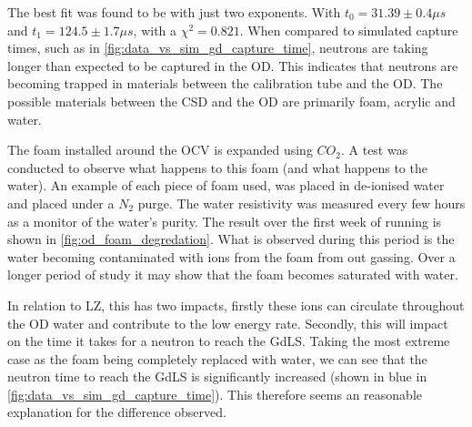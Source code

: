 \clearpage



\clearpage
\clearpage



\clearpage



\clearpage
\par
The best fit was found to be with just two exponents.
With $t_0 = 31.39 \pm 0.4\mu s$ and $t_1 = 124.5 \pm 1.7\mu s$, with a $\chi^2=0.821$.
When compared to simulated capture times, such as in \autoref{fig:data_vs_sim_gd_capture_time}, neutrons are taking longer than expected to be captured in the OD.
This indicates that neutrons are becoming trapped in materials between the calibration tube and the OD.
The possible materials between the CSD and the OD are primarily foam, acrylic and water.
\par
The foam installed around the OCV is expanded using $CO_2$.
A test was conducted to observe what happens to this foam (and what happens to the water).
An example of each piece of foam used, was placed in de-ionised water and placed under a $N_2$ purge. 
The water resistivity was measured every few hours as a monitor of the water's purity.
The result over the first week of running is shown in \autoref{fig:od_foam_degredation}.
What is observed during this period is the water becoming contaminated with ions from the foam from out gassing.
Over a longer period of study it may show that the foam becomes saturated with water.
\par
In relation to LZ, this has two impacts, firstly these ions can circulate throughout the OD water and contribute to the low energy rate.
Secondly, this will impact on the time it takes for a neutron to reach the GdLS.
Taking the most extreme case as the foam being completely replaced with water, we can see that the neutron time to reach the GdLS is significantly increased (shown in blue in \autoref{fig:data_vs_sim_gd_capture_time}).
This therefore seems an reasonable explanation for the difference observed.




